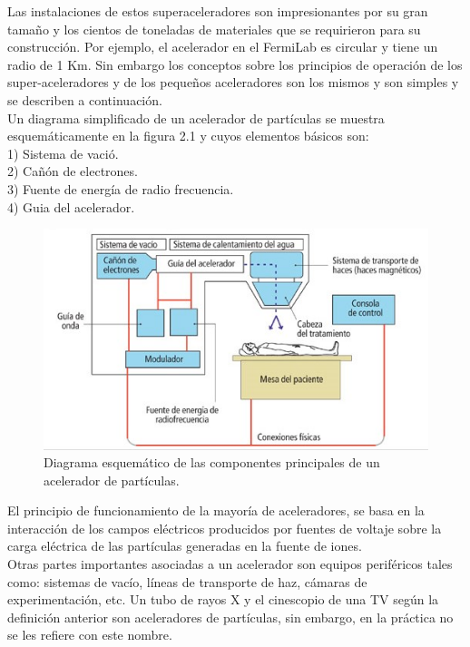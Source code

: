 Las instalaciones de estos superaceleradores son impresionantes por su gran tamaño y los cientos de toneladas de materiales que se requirieron para su construcción. Por ejemplo, el acelerador en el FermiLab es circular y tiene un radio de 1 Km. Sin embargo los conceptos sobre los principios de operación de los super-aceleradores y de los pequeños aceleradores son los mismos y son simples y se describen a continuación.\\

Un diagrama simplificado de un acelerador de partículas se muestra
esquemáticamente en la figura 2.1 y cuyos elementos básicos son:\\
\setlength{\parindent}{0cm}
1) Sistema de vació.\\
2) Cañón de electrones.\\
3) Fuente de energía de radio frecuencia.\\
4) Guia del acelerador.

\begin{figure}[H]
\centering
\includegraphics[width=12cm]{capitulo2/figs/acelerador.png}
\caption{Diagrama esquemático de las componentes principales de un acelerador de
partículas. \cite{c15}}
\end{figure}

El principio de funcionamiento de la mayoría de aceleradores, se basa en la
interacción de los campos eléctricos producidos por fuentes de voltaje sobre la
carga eléctrica de las partículas generadas en la fuente de iones.\\

Otras partes importantes asociadas a un acelerador son equipos periféricos
tales como: sistemas de vacío, líneas de transporte de haz, cámaras de
experimentación, etc. 
Un tubo de rayos X y el cinescopio de una TV  según la definición anterior son aceleradores de partículas, sin embargo, en la práctica no se les refiere con este nombre.\\

